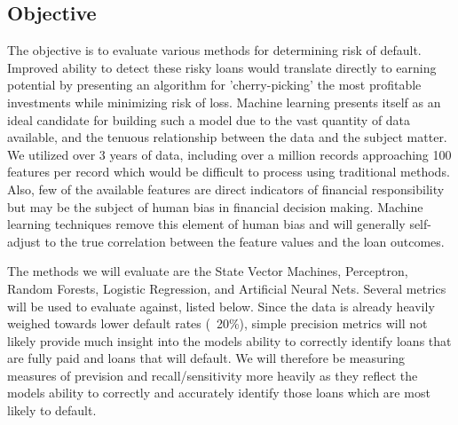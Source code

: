 \subsection{Objective}

The objective is to evaluate various methods for determining risk of default. Improved ability to detect these risky loans would translate directly to earning potential by presenting an algorithm for 'cherry-picking' the most profitable investments while minimizing risk of loss. Machine learning presents itself as an ideal candidate for building such a model due to the vast quantity of data available, and the tenuous relationship between the data and the subject matter. We utilized over 3 years of data, including over a million records approaching 100 features per record which would be difficult to process using traditional methods. Also, few of the available features are direct indicators of financial responsibility but may be the subject of human bias in financial decision making. Machine learning techniques remove this element of human bias and will generally self-adjust to the true correlation between the feature values and the loan outcomes.

The methods we will evaluate are the State Vector Machines, Perceptron, Random Forests, Logistic Regression, and Artificial Neural Nets. Several metrics will be used to evaluate against, listed below.  Since the data is already heavily weighed towards lower default rates (~20\%), simple precision metrics will not likely provide much insight into the models ability to correctly identify loans that are fully paid and loans that will default. We will therefore be measuring measures of prevision and recall/sensitivity more heavily as they reflect the models ability to correctly and accurately identify those loans which are most likely to default.

